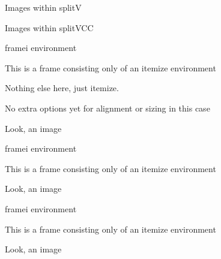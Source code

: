 \documentclass[11pt,compress,t,notes=noshow, xcolor=table]{beamer}
\begin{document}
\begin{frame}{Images within splitV}
  
  
  \vfill
  
  
\end{frame}


\begin{frame}{Images within splitVCC}
  
  
  \vfill
  
  
\end{frame}


\begin{framei}{framei environment}
  \item This is a frame consisting only of an itemize environment
  \item Nothing else here, just itemize.
  \item No extra options yet for alignment or sizing in this case
  \item Look, an image
\end{framei}

\begin{framei}{framei environment}
  \item This is a frame consisting only of an itemize environment
  
  
  \item Look, an image
\end{framei}

\begin{framei}{framei environment}
  \item This is a frame consisting only of an itemize environment
  
  
  \item Look, an image
\end{framei}
\end{document}
